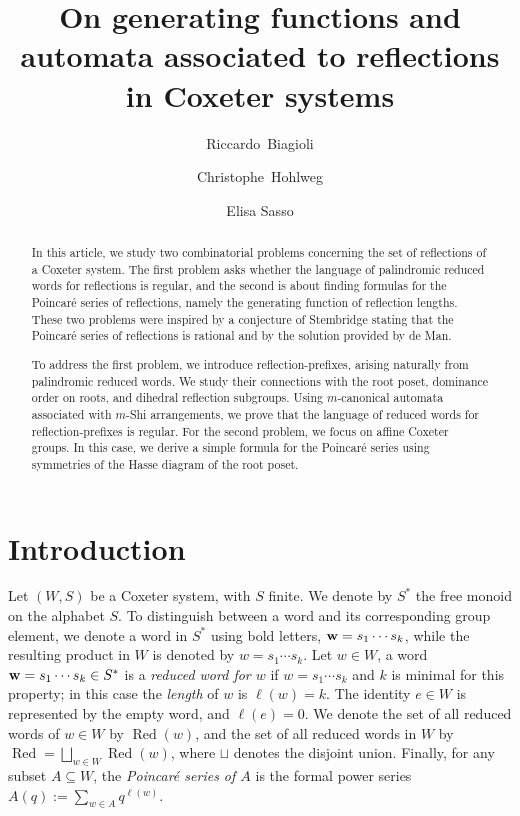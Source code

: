 \documentclass{amsart}
\title[Generating functions and automata associated to reflections]{On generating functions and automata associated to reflections  in Coxeter systems}
\author[R. Biagioli]{Riccardo~Biagioli}
\author[C. Hohlweg]{Christophe~Hohlweg}
\author[E. Sasso]{Elisa Sasso}
\theoremstyle{definition}
\newcommand{\Red}{{\operatorname{Red}}}
\begin{document}
\maketitle
\begin{abstract}
In this article, we study two combinatorial problems concerning the set of reflections of a Coxeter system.
The first problem asks whether the language of palindromic reduced words for reflections is regular, and the second is about finding formulas for the Poincaré series of reflections, namely the generating function of reflection lengths. These two problems were inspired by a conjecture of Stembridge stating that the Poincaré series of reflections is rational and by the solution provided by de Man. 

To address the first problem, we introduce reflection-prefixes, arising naturally from palindromic reduced words.
We study their connections with the root poset, dominance order on roots, and dihedral reflection subgroups.
Using  $m$-canonical automata associated with 
$m$-Shi arrangements, we prove that the language 
  of reduced words for reflection-prefixes is regular.
For the second problem, we focus on affine Coxeter groups.
In this case, we derive a simple formula for the Poincaré series using symmetries of the Hasse diagram of the root poset. 
\end{abstract}


\section{Introduction} 

Let $(W,S)$ be a Coxeter system, with $S$ finite. We denote by $S^*$ the free monoid on the alphabet $S$. To distinguish between a word and its corresponding group element, we denote a word in $S^*$ using bold letters, $\bold w =  s_1 \cdots  s_k$, while the resulting product in $W$ is denoted by $w=s_1\cdots s_k$. Let $w\in W$, a word $\bold w= s_1 \cdots  s_k\in S^*$ is a {\em reduced word for $w$} if  $w=s_1\cdots s_k$  and $k$ is minimal for this property; in this case the {\em length} of $w$ is $\ell(w)=k$. The identity $e\in W$ is represented by the empty word, and $\ell(e)=0$. We denote the set of all reduced words of $w\in W$ by $\Red(w)$, and the set of all reduced words in $W$ by $\Red=\bigsqcup_{w\in W} \Red(w)$, where $\sqcup$ denotes the disjoint union.
Finally, for any subset $A\subseteq W$, the {\em Poincar\'e series of $A$} is the formal power series
$A(q):=\sum_{w\in A} q^{\ell(w)}.$
\smallskip
\end{document}
